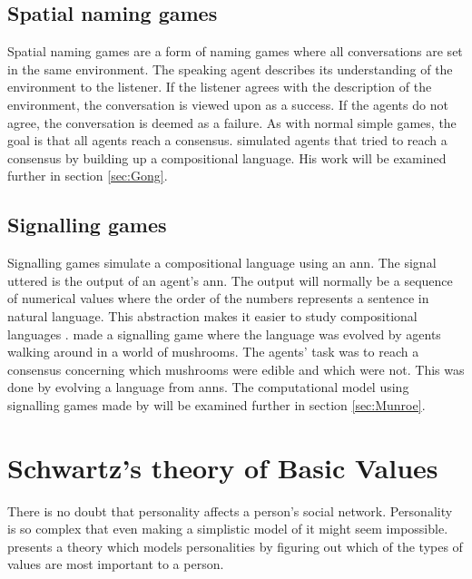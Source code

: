 \subsection{Spatial naming games}\label{SpatNamingGame}
Spatial naming games are a form of naming games where all conversations are set in the same environment. The speaking agent describes its understanding of the environment to the listener. If the listener agrees with the description of the environment, the conversation is viewed upon as a success. If the agents do not agree, the conversation is deemed as a failure. As with normal simple games, the goal is that all agents reach a consensus. \citeauthor{gong2011simulating} simulated agents that tried to reach a consensus by building up a compositional language. His work will be examined further in section \ref{sec:Gong}.

\subsection{Signalling games}
Signalling games simulate a compositional language using an \ac{ann}. The signal uttered is the output of an agent's \ac{ann}. The output will normally be a sequence of numerical values where the order of the numbers represents a sentence in natural language. This abstraction makes it easier to study compositional languages \citep{munroe2002learning, suzuki2008learning}. \citeauthor{munroe2002learning} made a signalling game where the language was evolved by agents walking around in a world of mushrooms. The agents' task was to reach a consensus concerning which mushrooms were edible and which were not. This was done by evolving a language from \acp{ann}. The computational model using signalling games made by \citeauthor{munroe2002learning} will be examined further in section \ref{sec:Munroe}.


\section{Schwartz's theory of Basic Values}\label{SchwartzBasicValues}
There is no doubt that personality affects a person's social network. Personality is so complex that even making a simplistic model of it might seem impossible. \citet{schwartz1992unniversals} presents a theory which models personalities by figuring out which of the types of values are most important to a person.

